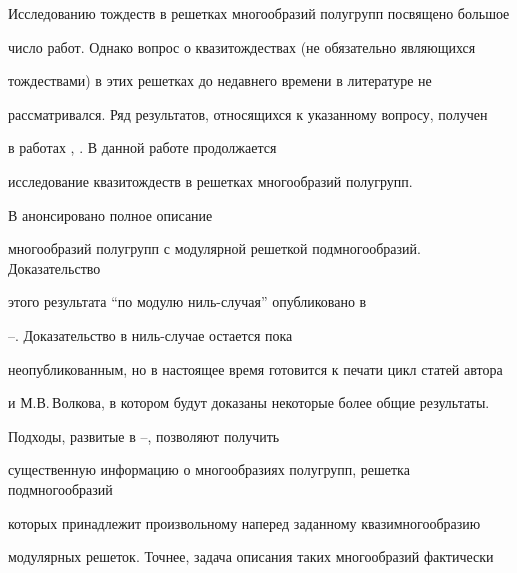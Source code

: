 \date{}




\pagestyle{plain} %







\maketitle


\label{begin}








Исследованию тождеств в решетках многообразий полугрупп посвящено большое


число работ. Однако вопрос о квазитождествах (не обязательно являющихся


тождествами) в этих решетках до недавнего времени в литературе не


рассматривался. Ряд результатов, относящихся к указанному вопросу, получен


в работах \cite{Ver99a}, \cite{Ver01}. В данной работе продолжается


исследование квазитождеств в решетках многообразий полугрупп.





В \cite{Vol92c} анонсировано полное описание


многообразий полугрупп с модулярной решеткой подмногообразий. Доказательство


этого результата ``по модулю ниль-случая'' опубликовано в


\cite{Vol89}--\cite{VE}. Доказательство в ниль-случае остается пока


неопубликованным, но в настоящее время готовится к печати цикл статей автора


и М.В.\,Волкова, в котором будут доказаны некоторые более общие результаты.


Подходы, развитые в \cite{Vol89}--\cite{Vol92b}, позволяют получить


существенную информацию о многообразиях полугрупп, решетка подмногообразий


которых принадлежит произвольному наперед заданному квазимногообразию


модулярных решеток. Точнее, задача описания таких многообразий фактически


